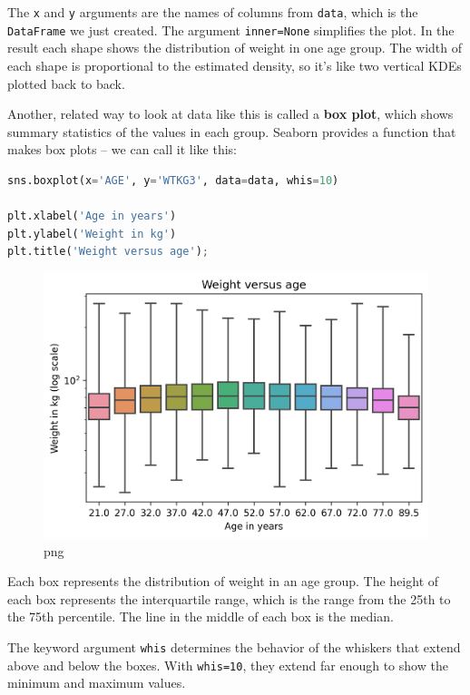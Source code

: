 \documentclass[
]{book}
\newcommand{\passthrough}[1]{#1}
\begin{document}
The \passthrough{\lstinline!x!} and \passthrough{\lstinline!y!}
arguments are the names of columns from \passthrough{\lstinline!data!},
which is the \passthrough{\lstinline!DataFrame!} we just created. The
argument \passthrough{\lstinline!inner=None!} simplifies the plot. In
the result each shape shows the distribution of weight in one age group.
The width of each shape is proportional to the estimated density, so
it's like two vertical KDEs plotted back to back.

Another, related way to look at data like this is called a \textbf{box
plot}, which shows summary statistics of the values in each group.
Seaborn provides a function that makes box plots -- we can call it like
this:

\begin{lstlisting}[language=Python]
sns.boxplot(x='AGE', y='WTKG3', data=data, whis=10)

plt.xlabel('Age in years')
plt.ylabel('Weight in kg')
plt.title('Weight versus age');
\end{lstlisting}

\begin{figure}
\centering
\includegraphics{09_relationships_files/09_relationships_46_0.png}
\caption{png}
\end{figure}

Each box represents the distribution of weight in an age group. The
height of each box represents the interquartile range, which is the
range from the 25th to the 75th percentile. The line in the middle of
each box is the median.

The keyword argument \passthrough{\lstinline!whis!} determines the
behavior of the whiskers that extend above and below the boxes. With
\passthrough{\lstinline!whis=10!}, they extend far enough to show the
minimum and maximum values.
\end{document}
